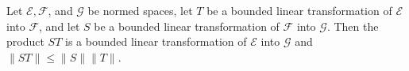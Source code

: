 Let $\mathcal{E}, \mathcal{F}$, and $\mathcal{G}$ be normed spaces, let $T$ be a bounded linear transformation of $\mathcal{E}$ into $\mathcal{F}$, and let $S$ be a bounded linear transformation of $\mathcal{F}$ into $\mathcal{G}$. Then the product $ST$ is a bounded linear transformation of $\mathcal{E}$ into $\mathcal{G}$ and $\| ST \| \leq \| S \| \| T \|$.
